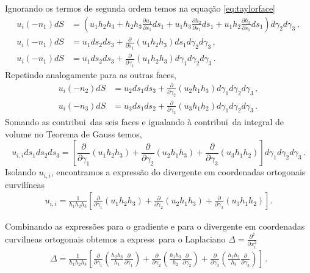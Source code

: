 Ignorando os termos de segunda ordem temos na equa\c{c}\~ao \ref{eq:taylorface}
\begin{align}
  u_i(-n_1)dS &= \left(u_1h_2h_3 + h_2h_3\frac{\partial u_1}{\partial
  s_1}ds_1 +
  u_1h_3\frac{\partial h_2}{\partial s_1}ds_1 + u_1h_2\frac{\partial
  h_3}{\partial s_1}ds_1
  \right)d\gamma_2d\gamma_3\, , \\
  u_i(-n_1)dS &= u_1ds_2ds_3+\frac{\partial}{\partial
  s_1}(u_1h_2h_3)ds_1d\gamma_2d\gamma_3\, , \\
  u_i(-n_1)dS &= u_1ds_2ds_3+\frac{\partial}{\partial
  \gamma_1}(u_1h_2h_3)d\gamma_1d\gamma_2d\gamma_3\,  .
\end{align}
Repetindo analogamente para as outras faces,
\begin{align}
  u_i(-n_2)dS &= u_2ds_1ds_3+\frac{\partial}{\partial
  \gamma_2}(u_2h_1h_3)d\gamma_1d\gamma_2d\gamma_3\,  , \\
  u_i(-n_3)dS &= u_3ds_1ds_2+\frac{\partial}{\partial
  \gamma_3}(u_3h_1h_2)d\gamma_1d\gamma_2d\gamma_3\,  .
\end{align}
Somando as contribui\coes\ das seis faces e igualando \`a contribui\cao\ da integral de volume no 
Teorema de Gauss temos,
\begin{equation}
  u_{i,i}ds_1ds_2ds_3 = \left[\frac{\partial}{\partial \gamma_1} (u_1 h_2 h_3 ) +
  \frac{\partial}{\partial \gamma_{2}}(u_2h_1h_3) +  
  \frac{\partial}{\partial\gamma_{3}}(u_{3}h_{1}h_{2})\right]d\gamma_{1}d\gamma_{2}d\gamma_3 \, .
\end{equation}
Isolando $u_{i,i}$, encontramos a express\~ao do divergente em coordenadas
ortogonais curvi\-l\'ineas 
\begin{eqnarray}
  u_{i,i}=\frac{1}{h_{1}h_{2}h_{3}}\left[\frac{\partial}{\partial\gamma_{1}}(u_{1}h_{2}h_{3}) 
       +\frac{\partial}{\partial \gamma_{2}}(u_{2}h_{1}h_{3})  
       +\frac{\partial}{\partial \gamma_{3}}(u_{3}h_{1}h_{2})\right].
\end{eqnarray}

Combinando as express\~oes para o gradiente e para o divergente em coordenadas curvil\ih neas 
ortogonais obtemos a express\ao\ para o 
Laplaciano $\Delta = \frac{\partial^{2}}{\partial x_{i}^{2}}$
\begin{eqnarray}
\Delta = \frac{1}{h_1 h_2 h_3}\left[\frac{\partial}{\partial\gamma_1}\left(\frac{h_2 h_3}{h_1}
  \frac{\partial}{\partial\gamma_1}\right) +
\frac{\partial}{\partial\gamma_{2}}\left(\frac{h_{1}h_{3}}{h_{2}}
  \frac{\partial}{\partial\gamma_{2}}\right)+
 \frac{\partial}{\partial\gamma_{3}}\left(\frac{h_{1}h_{2}}{h_{3}}
  \frac{\partial}{\partial\gamma_{3}}\right)\right]\, .
\end{eqnarray}


